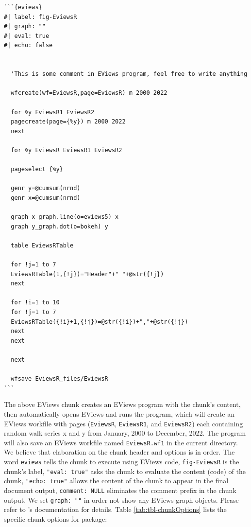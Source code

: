 \begin{verbatim}
```{eviews}     
#| label: fig-EviewsR
#| graph: ""
#| eval: true
#| echo: false


  'This is some comment in EViews program, feel free to write anything
  
  wfcreate(wf=EviewsR,page=EviewsR) m 2000 2022

  for %y EviewsR1 EviewsR2
  pagecreate(page={%y}) m 2000 2022
  next

  for %y EviewsR EviewsR1 EviewsR2
  
  pageselect {%y}
  
  genr y=@cumsum(nrnd)
  genr x=@cumsum(nrnd)
  
  graph x_graph.line(o=eviews5) x
  graph y_graph.dot(o=bokeh) y
  
  table EviewsRTable

  for !j=1 to 7
  EviewsRTable(1,{!j})="Header"+" "+@str({!j})
  next

  for !i=1 to 10
  for !j=1 to 7
  EviewsRTable({!i}+1,{!j})=@str({!i})+","+@str({!j})
  next
  next 

  next
  
  wfsave EviewsR_files/EviewsR
```  
\end{verbatim}

The above EViews chunk creates an EViews program with the chunk's content, then automatically opens EViews and runs the program, which will create an EViews workfile with pages (\texttt{EviewsR}, \texttt{EviewsR1}, and \texttt{EviewsR2}) each containing random walk series x and y from January, 2000 to December, 2022. The program will also save an EViews workfile named \texttt{EviewsR.wf1} in the current directory. We believe that elaboration on the chunk header and options is in order. The word \texttt{eviews} tells the chunk to execute using EViews code, \texttt{fig-EviewsR} is the chunk's label, \texttt{"eval:\ true"} asks the chunk to evaluate the content (code) of the chunk, \texttt{"echo:\ true"} allows the content of the chunk to appear in the final document output, \texttt{comment:\ NULL} eliminates the comment prefix in the chunk output. We set \texttt{\textquotesingle{}graph:\ ""\textquotesingle{}} in order not show any EViews graph objects. Please refer to 's documentation for details. Table \ref{tab:tbl-chunkOptions} lists the specific chunk options for  package:

